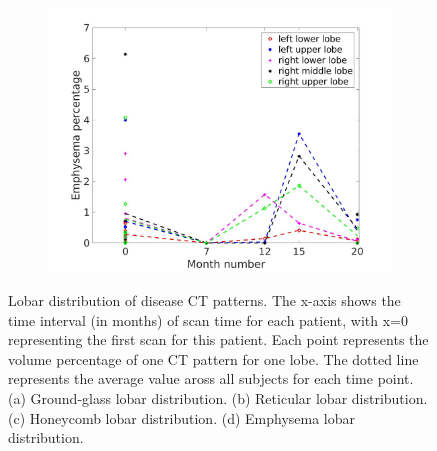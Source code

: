 \begin{figure}[htbp]
\begin{subfigure}{.46\linewidth}
  \includegraphics[width=\linewidth,trim={{.0\wd0} {.0\wd0} {.0\wd0} {.0\wd0}},clip]{QuantitativeAnalysis/Image/EmphysemaLobarRegionDiseaseDistributionAverage.jpg}
  \caption{}
  \label{fig:LobarRegionDiseaseDistributionAverage-d}
\end{subfigure}
\caption{Lobar distribution of disease CT patterns. The x-axis shows the time interval (in months) of scan time for each patient, with x=0 representing the first scan for this patient. Each point represents the volume percentage of one CT pattern for one lobe. The dotted line represents the average value aross all subjects for each time point. (a) Ground-glass lobar distribution. (b) Reticular lobar distribution. (c) Honeycomb lobar distribution. (d) Emphysema lobar distribution.}
\label{fig:LobarRegionDiseaseDistributionAverage}
\end{figure}

